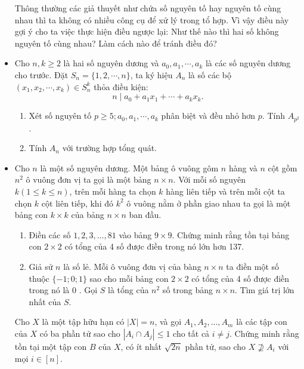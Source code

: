 \documentclass[11pt]{scrartcl}
\begin{document}
\begin{itemize}[label=, leftmargin=0em, itemsep=0.5em]
\begin{sol}
    \end{sol}
     Thông thường các giả thuyết như chứa số nguyên tố hay nguyên tố cùng nhau thì ta không có nhiều công cụ để xử lý trong tổ hợp. Vì vậy điều này gợi ý cho ta việc thực hiện điều ngược lại: Như thế nào thì hai số không nguyên tố cùng nhau? Làm cách nào để tránh điều đó?
    \item \begin{btvn}
        Cho $n, k \geq 2$ là hai số nguyên dương và $a_0, a_1, \cdots, a_k$ là các số nguyên dương cho trước. Đặt $S_n=\{1,2, \cdots, n\}$, ta ký hiệu $A_n$ là số các bộ $\left(x_1, x_2, \cdots, x_k\right) \in S_n^k$ thỏa điều kiện:
        $$
        n \mid a_0+a_1 x_1+\cdots+a_k x_k .
        $$
        \begin{enumerate}[label=(\alph*)]
            \item Xét số nguyên tố $p \geq 5 ; a_0, a_1, \cdots, a_k$ phân biệt và đều nhỏ hơn $p$. Tính $A_{p^2}$.
            \item Tính $A_n$ với trường hợp tổng quát.
        \end{enumerate}
    \end{btvn}
    \item \begin{btvn}
        Cho $n$ là một số nguyên dương. Một bảng ô vuông gôm $n$ hàng và $n$ cột gồm $n^2$ ô vuông đơn vị ta gọi là một bảng $n \times n$.
        Với mỗi số nguyên $k(1 \leq k \leq n)$, trên mỗi hàng ta chọn $k$ hàng liên tiếp và trên mỗi cột ta chọn $k$ cột liên tiếp, khi đó $k^2$ ô vuông nằm ở phần giao nhau ta gọi là một bảng con $k \times k$ của bảng $n \times n$ ban đầu.
        \begin{enumerate}[label=(\alph*)]
            \item Điền các số $1,2,3, \ldots, 81$ vào bảng $9 \times 9$. Chứng minh rằng tồn tại bảng con $2 \times 2$ có tổng của 4 số được điền trong nó lớn hơn 137.
            \item Giả sử $n$ là số lẻ. Mỗi ô vuông đơn vị của bàng $n \times n$ ta điền một số thuộc $\{-1 ; 0 ; 1\}$ sao cho mỗi bảng con $2 \times 2$ có tổng của 4 số được điền trong nó là 0 . Gọi $S$ là tổng của $n^2$ số trong bảng $n \times n$. Tìm giá trị lớn nhất của $S$.
        \end{enumerate}
    \end{btvn}
    \begin{bt}
        Cho $X$ là một tập hữu hạn có $|X| = n$, và gọi $A_1, A_2, \dots, A_m$ là các tập con của $X$ có ba phần tử sao cho $|A_i \cap A_j| \le 1$ cho tất cả $i \neq j$. Chứng minh rằng tồn tại một tập con $B$ của $X$, có ít nhất $\sqrt{2n}$ phần tử, sao cho $X \nsupseteq  A_i$ với mọi $i \in [n]$.

\end{bt}
\end{itemize}
\end{document}
